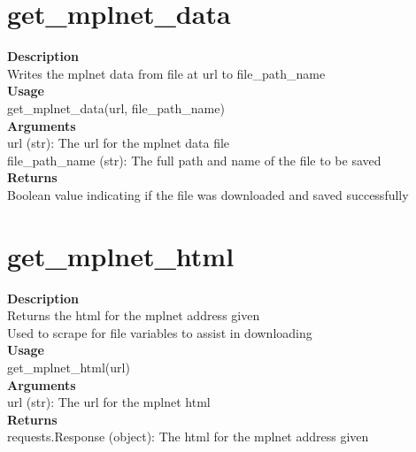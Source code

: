 \documentclass[11pt, oneside]{article}
\begin{document}
\newpage

\section{get\_mplnet\_data}

\textbf{Description} \\
        Writes the mplnet data from file at url to file\_path\_name\\

\noindent\textbf{Usage} \\
        get\_mplnet\_data(url, file\_path\_name) \\

\noindent\textbf{Arguments} \\
        url (str): The url for the mplnet data file \\
        file\_path\_name (str): The full path and name of the file to be saved \\

\noindent\textbf{Returns} \\
        Boolean value indicating if the file was downloaded and saved successfully


\section{get\_mplnet\_html}

\textbf{Description} \\
        Returns the html for the mplnet address given \\
        Used to scrape for file variables to assist in downloading \\

\noindent\textbf{Usage} \\
        get\_mplnet\_html(url) \\

\noindent\textbf{Arguments} \\
        url (str): The url for the mplnet html \\

\noindent\textbf{Returns} \\
        requests.Response (object): The html for the mplnet address given \\
\end{document}
